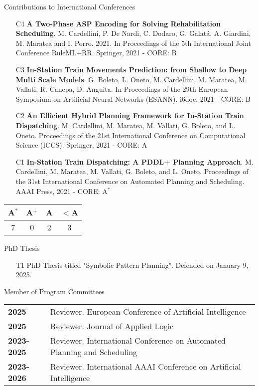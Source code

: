 \documentclass{resume} %
\begin{document}
\begin{rSection}{Contributions to International Conferences}
\begin{enumerate}[leftmargin=5mm]
	\item[C4] \textbf{A Two-Phase ASP Encoding for Solving Rehabilitation Scheduling}. M. Cardellini, P. De Nardi, C. Dodaro, G. Galat\'a, A. Giardini, M. Maratea and I. Porro. 2021. In Proceedings of the 5th International Joint Conference RuleML+RR. Springer, 2021 - CORE: B
	
	
	\item[C3] \textbf{In-Station Train Movements Prediction: from Shallow to Deep Multi Scale Models}. G. Boleto, L. Oneto, M. Cardellini, M. Maratea, M. Vallati, R. Canepa, D. Anguita. In Proceedings of the 29th European Symposium on Artificial Neural Networks (ESANN). i6doc, 2021 - CORE: B
	
	\item[C2] \textbf{An Efficient Hybrid Planning Framework for In-Station Train Dispatching}. M. Cardellini, M. Maratea, M. Vallati, G. Boleto, and L. Oneto. Proceedings of the 21st International Conference on Computational Science (ICCS). Springer, 2021 - CORE: A
	
	\item[C1] \textbf{In-Station Train Dispatching: A PDDL+ Planning Approach}. M. Cardellini, M. Maratea, M. Vallati, G. Boleto, and L. Oneto. Proceedings of the 31st International Conference on Automated Planning and Scheduling. AAAI Press, 2021 - CORE: A$^{*}$
\end{enumerate}
\begin{center}
\begin{tabular}{|c|c|c|c|}
	\hline
A$^{*}$ & A$^+$ & A & $<$A \\ \hline
7 & 0 & 2 & 3 \\ \hline
\end{tabular}%
\end{center}
\end{rSection}

 \begin{rSection}{PhD Thesis}
  \begin{enumerate}[leftmargin=5mm]
	\item[T1] PhD Thesis titled "Symbolic Pattern Planning". Defended on January 9, 2025.	
	\end{enumerate}
 \end{rSection}
 
 
  \begin{rSection}{Member of Program Committees}
	\begin{tabularx}{0.95\textwidth} {lp{14cm}}
 \textbf{2025} & Reviewer. European Conference of Artificial Intelligence \\
 \textbf{2025} & Reviewer. Journal of Applied Logic \\
 \textbf{2023-2025} & Reviewer. International Conference on Automated Planning and Scheduling \\
 \textbf{2023-2026} & Reviewer. International AAAI Conference on Artificial Intelligence 
  \end{tabularx}
 \end{rSection}
 
\end{document}
